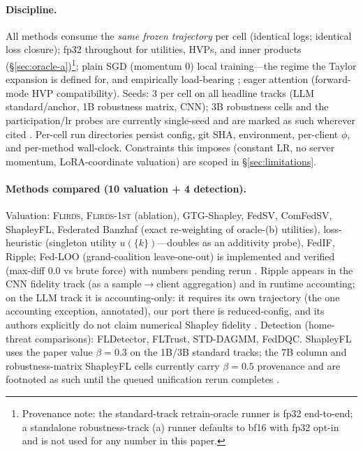 \paragraph{Discipline.}
All methods consume the \emph{same frozen trajectory} per cell (identical logs;
identical loss closure); fp32 throughout for utilities, HVPs, and inner
products (\S\ref{sec:oracle-a})\footnote{Provenance note: the standard-track
retrain-oracle runner is fp32 end-to-end; a standalone robustness-track (a)
runner defaults to bf16 with fp32 opt-in and is not used for any number in
this paper. };
plain SGD (momentum $0$) local training---the regime the Taylor expansion is
defined for, and empirically load-bearing ; eager attention (forward-mode HVP compatibility). Seeds: 3 per cell on
all headline tracks (LLM standard/anchor, 1B robustness matrix, CNN); 3B
robustness cells and the participation/lr probes are currently single-seed and
are marked as such wherever cited . Per-cell run
directories persist config, git SHA, environment, per-client $\phi$, and
per-method wall-clock. Constraints this imposes (constant LR, no server
momentum, LoRA-coordinate valuation) are scoped in \S\ref{sec:limitations}.

\paragraph{Methods compared (10 valuation + 4 detection).}
Valuation: \textsc{Flirds}, \textsc{Flirds-1st} (ablation), GTG-Shapley, FedSV,
ComFedSV, ShapleyFL, Federated Banzhaf (exact re-weighting of oracle-(b)
utilities), loss-heuristic (singleton utility $u(\{k\})$---doubles as an
additivity probe), FedIF, Ripple; Fed-LOO (grand-coalition leave-one-out) is
implemented and verified (max-diff $0.0$ vs brute force) with numbers pending
rerun . Ripple appears in the CNN fidelity track (as a
sample$\to$client aggregation) and in runtime accounting; on the LLM track it
is accounting-only: it requires its own trajectory (the one accounting
exception, annotated), our port there is reduced-config, and its authors
explicitly do not claim numerical Shapley fidelity . Detection (home-threat comparisons): FLDetector, FLTrust,
STD-DAGMM, FedDQC. ShapleyFL uses the paper value $\beta{=}0.3$ on the 1B/3B
standard tracks; the 7B column and robustness-matrix ShapleyFL cells currently
carry $\beta{=}0.5$ provenance and are footnoted as such until the queued
unification rerun completes .

